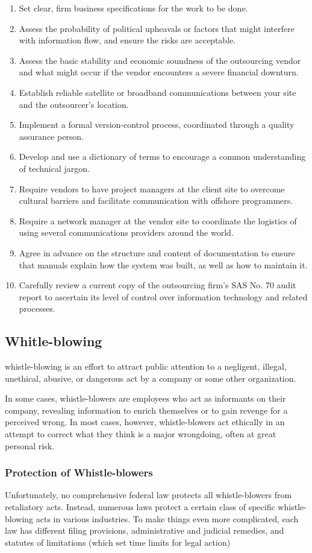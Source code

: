 \documentclass[11pt]{article}
\begin{document}
\begin{enumerate}
\item Set clear, firm business specifications for the work to be done.
\item Assess the probability of political upheavals or factors that might interfere with information flow, and ensure the risks are acceptable.
\item Assess the basic stability and economic soundness of the outsourcing vendor and what might occur if the vendor encounters a severe financial downturn.
\item Establish reliable satellite or broadband communications between your site and the outsourcer’s location.
\item Implement a formal version-control process, coordinated through a quality assurance person.
\item Develop and use a dictionary of terms to encourage a common understanding of technical jargon.
\item Require vendors to have project managers at the client site to overcome cultural barriers and facilitate communication with offshore programmers.
\item Require a network manager at the vendor site to coordinate the logistics of using several communications providers around the world.
\item Agree in advance on the structure and content of documentation to ensure that manuals explain how the system was built, as well as how to maintain it.
\item Carefully review a current copy of the outsourcing firm’s SAS No. 70 audit report to ascertain its level of control over information technology and related processes.
\end{enumerate}
\subsection{Whitle-blowing}
\label{sec:orgad07ff4}
whistle-blowing is an effort to attract public attention to a negligent, illegal, unethical, abusive, or dangerous act by a company or some other organization.

In some cases, whistle-blowers are employees who act as informants on their company, revealing information to enrich themselves or to gain revenge for a perceived wrong. In most cases, however, whistle-blowers act ethically in an attempt to correct what they think is a major wrongdoing, often at great personal risk.
\subsubsection{Protection of Whistle-blowers}
\label{sec:orgf5b8f8e}
Unfortunately, no comprehensive federal law protects all whistle-blowers from retaliatory acts. Instead, numerous laws protect a certain class of specific whistle-blowing acts in various
industries. To make things even more complicated, each law has different filing provisions, administrative and judicial remedies, and statutes of limitations (which set time limits for
legal action)
\end{document}
